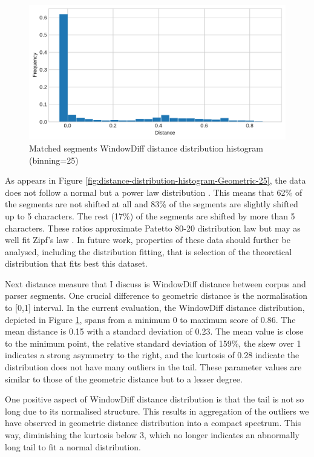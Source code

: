     \begin{figure}[!ht]
    \centering
    \includegraphics[width=.85\textwidth]{evaluation-results/figures/distance-distribution-histogram-WindowDiff-25.pdf}
    \caption{Matched segments WindowDiff distance distribution histogram (binning=25)}
    \label{fig:distance-distribution-histogram-WindowDiff-25}
    \end{figure}
    
    As appears in Figure \ref{fig:distance-distribution-histogram-Geometric-25}, the data does not follow a normal but a power law distribution \citep{newman2005power}. This means that 62\% of the segments are not shifted at all and 83\% of the segments are slightly shifted up to 5 characters. The rest (17\%) of the segments are shifted by more than 5 characters. These ratios approximate Patetto 80-20 distribution law but may as well fit Zipf's law \citep{newman2005power}. In future work, properties of these data should further be analysed, including the distribution fitting, that is selection of the theoretical distribution that fits best this dataset.
    
    Next distance measure that I discuss is WindowDiff distance between corpus and parser segments. One crucial difference to geometric distance is the normalisation to [0,1] interval. In the current evaluation, the WindowDiff distance distribution, depicted in Figure \ref{fig:distance-distribution-histogram-WindowDiff-25}, spans from a minimum 0 to maximum score of 0.86. The mean distance is 0.15 with a standard deviation of 0.23. The mean value is close to the minimum point, the relative standard deviation of 159\%, the skew over 1 indicates a strong asymmetry to the right, and the kurtosis of 0.28 indicate the distribution does not have many outliers in the tail. These parameter values are similar to those of the geometric distance but to a lesser degree. 
    
    One positive aspect of WindowDiff distance distribution is that the tail is not so long due to its normalised structure. This results in aggregation of the outliers we have observed in geometric distance distribution into a compact spectrum. This way, diminishing the kurtosis below 3, which no longer indicates an abnormally long tail to fit a normal distribution. 
    
